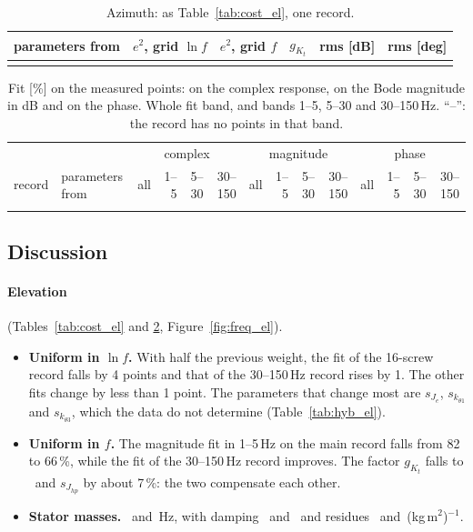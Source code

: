 \documentclass[10pt,a4paper]{article}
\numberwithin{equation}{section}
\begin{document}
\begin{table}[H]\centering\footnotesize\setlength{\tabcolsep}{4pt}
\caption{Azimuth: as Table~\ref{tab:cost_el}, one record.}\label{tab:cost_az}
\begin{tabular}{lrrrll}\toprule
parameters from & $e^2$, grid $\ln f$ & $e^2$, grid $f$ & $g_{K_t}$ & rms [dB] & rms [deg] \\ \midrule
\\ \bottomrule
\end{tabular}\end{table}

\begin{table}[H]\centering\scriptsize\setlength{\tabcolsep}{2.6pt}
\caption{Fit [\%] on the measured points: on the complex response, on the Bode magnitude in dB and on the phase. Whole fit band, and bands 1--5, 5--30 and 30--150\,Hz. ``--'': the record has no points in that band.}\label{tab:bode}
\begin{tabular}{llrrrrrrrrrrrr}\toprule
& & \multicolumn{4}{c}{complex} & \multicolumn{4}{c}{magnitude} & \multicolumn{4}{c}{phase} \\
\cmidrule(lr){3-6}\cmidrule(lr){7-10}\cmidrule(lr){11-14}
record & parameters from & all & 1--5 & 5--30 & 30--150 & all & 1--5 & 5--30 & 30--150 & all & 1--5 & 5--30 & 30--150 \\ \midrule
\\ \bottomrule
\end{tabular}\end{table}

\subsection{Discussion}
\paragraph{Elevation} (Tables~\ref{tab:cost_el} and \ref{tab:bode}, Figure~\ref{fig:freq_el}).
\begin{itemize}
\item \textbf{Uniform in $\ln f$.} With half the previous weight, the fit of the 16-screw record falls by 4 points and that of the 30--150\,Hz record rises by 1. The other fits change by less than 1 point. The parameters that change most are $s_{J_e}$, $s_{k_{\theta1}}$ and $s_{k_{\theta3}}$, which the data do not determine (Table~\ref{tab:hyb_el}).
\item \textbf{Uniform in $f$.} The magnitude fit in 1--5\,Hz on the main record falls from 82 to 66\,\%, while the fit of the 30--150\,Hz record improves. The factor $g_{K_t}$ falls to \gKtFP\ and $s_{J_{hp}}$ by about 7\,\%: the two compensate each other.
\item \textbf{Stator masses.} \fMassI\ and \fMassII\,Hz, with damping \zMassI\ and \zMassII\ and residues \aMassI\ and \aMassII\,(kg\,m$^2$)$^{-1}$.
\end{itemize}
\end{document}
